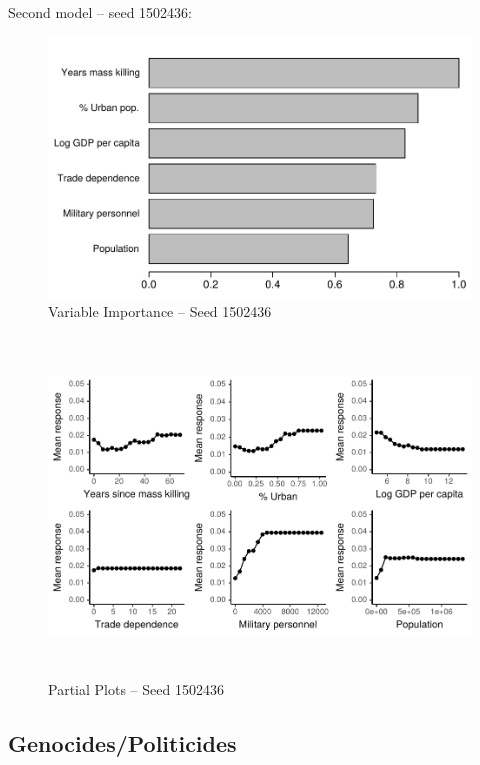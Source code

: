 \documentclass[a4paper,12pt]{article}
\begin{document}
\newpage

Second model -- seed 1502436: 

\begin{figure}[H]
    \centering
    \includegraphics{images/drf-mk3.pdf}
    \caption{Variable Importance -- Seed 1502436}
    \label{fig:my_label}
\end{figure}

\begin{figure}[H]
    \centering
    \includegraphics[width=\textwidth, height=9cm]{images/drfdpp3a.pdf}
    \caption{Partial Plots -- Seed 1502436}
    \label{fig:my_label}
\end{figure}

\newpage

\subsection{Genocides/Politicides}
\label{sec:mk-other-variable}
\end{document}
